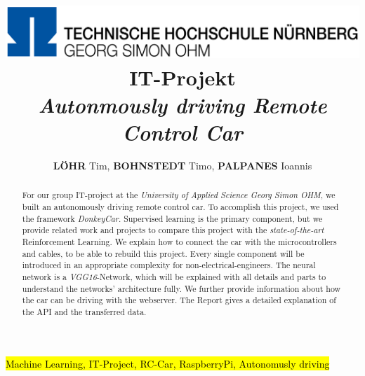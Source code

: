 \documentclass[journal]{IEEEtran}
\begin{document}
	
    \title{    
    \includegraphics[width=7.5in]{photo/logo.png}
    \newline \newline
     IT-Projekt \\ 
     \textit{Autonmously driving Remote Control Car
     \\ }
     }

  \author{
      \textbf{L\"OHR} Tim,
      \textbf{BOHNSTEDT} Timo, 
      \textbf{PALPANES} Ioannis
}



\maketitle
\begin{abstract}
For our group IT-project at the \textit{University of Applied Science Georg Simon OHM}, we built an autonomously driving remote control car. To accomplish this project, we used the framework \textit{DonkeyCar}. Supervised learning is the primary component, but we provide related work and projects to compare this project with the \textit{state-of-the-art} Reinforcement Learning. We explain how to connect the car with the microcontrollers and cables, to be able to rebuild this project. Every single component will be introduced in an appropriate complexity for non-electrical-engineers.  The neural network is a \textit{VGG16}-Network, which will be explained with all details and parts to understand the networks' architecture fully. We further provide information about how the car can be driving with the webserver. The Report gives a detailed explanation of the API and the transferred data.
\end{abstract}
\begin{IEEEkeywords}
\hl{Machine Learning, IT-Project, RC-Car, RaspberryPi, Autonomusly driving}
\end{IEEEkeywords}
\IEEEpeerreviewmaketitle

\end{document}
